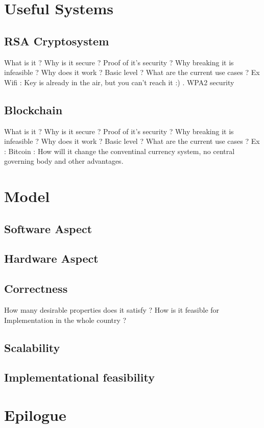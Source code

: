 \documentclass[12pt]{report}
\begin{document}
\chapter{Useful Systems}
\section{RSA Cryptosystem}
What is it ? Why is it secure ? Proof of it's security ? Why breaking it is infeasible ? Why does it work ? Basic level ? What are the current use cases ?
Ex Wifi : Key is already in the air, but you can't reach it :) . WPA2 security 

\section{Blockchain}
What is it ? Why is it secure ? Proof of it's security ? Why breaking it is infeasible ? Why does it work ? Basic level ? What are the current use cases ?
Ex : Bitcoin : How will it change the conventinal currency system, no central governing body and other advantages.


\chapter{Model}

\section{Software Aspect}
\section{Hardware Aspect}
\section{Correctness}
How many desirable properties does it satisfy ? How is it feasible for Implementation in the whole country ?
\section{Scalability}
\section{Implementational feasibility}


\chapter{Epilogue}
\end{document}
